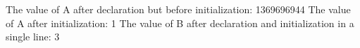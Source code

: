 The value of A after declaration but before initialization: 1369696944
The value of A after initialization: 1
The value of B after declaration and initialization in  a single line: 3
